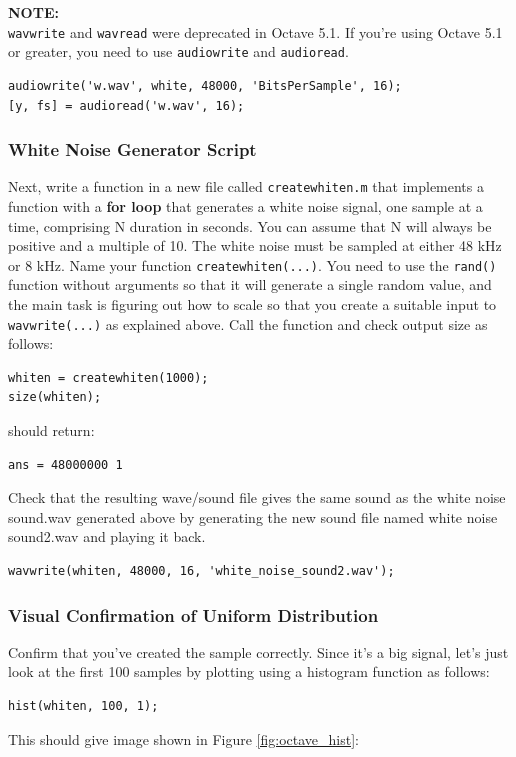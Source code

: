 \textbf{NOTE:}\\
\verb|wavwrite| and \verb|wavread| were deprecated in Octave 5.1. If you're using Octave 5.1 or greater, you need to use \verb|audiowrite| and \verb|audioread|.
\begin{lstlisting}
audiowrite('w.wav', white, 48000, 'BitsPerSample', 16);
[y, fs] = audioread('w.wav', 16);
\end{lstlisting}

\subsubsection{White Noise Generator Script}
Next, write a function in a new file called \verb|createwhiten.m| that implements a function with a \textbf{for loop} that generates a white noise signal, one sample at a time, comprising N duration in seconds. You can assume that N will always be positive and a multiple of 10. The white noise must be sampled at either 48 kHz or 8 kHz. Name your function \verb|createwhiten(...)|. You need to use the \verb|rand()| function without arguments so that it will generate a single random value, and the main task is figuring out how to scale so that you create a suitable input to \verb|wavwrite(...)| as explained above. Call the function and check output size as follows:
\begin{lstlisting}
whiten = createwhiten(1000);
size(whiten);
\end{lstlisting}
should return:
\begin{lstlisting}
ans = 48000000 1
\end{lstlisting}
Check that the resulting wave/sound file gives the same sound as the white noise sound.wav generated above by generating the new sound file named white noise sound2.wav and playing it back.
\begin{lstlisting}
wavwrite(whiten, 48000, 16, 'white_noise_sound2.wav');
\end{lstlisting}

\subsubsection{Visual Confirmation of Uniform Distribution}
Confirm that you've created the sample correctly. Since it’s a big signal, let’s just look at the first 100 samples by plotting using a histogram function as follows:
\begin{lstlisting}
hist(whiten, 100, 1);
\end{lstlisting}
This should give image shown in Figure \ref{fig:octave_hist}:


